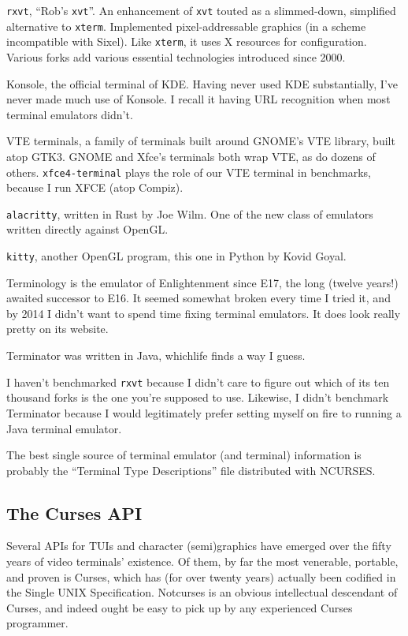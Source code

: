 \begin{denseitemize}
\item{\texttt{rxvt}, ``Rob's \texttt{xvt}''. An enhancement of \texttt{xvt} touted
    as a slimmed-down, simplified alternative to \texttt{xterm}. Implemented pixel-addressable
    graphics (in a scheme incompatible with Sixel). Like \texttt{xterm}, it uses
    X resources for configuration. Various forks add various essential technologies
    introduced since 2000.}
\item{Konsole, the official terminal of KDE. Having never used KDE substantially,
   I've never made much use of Konsole. I recall it having URL recognition
   when most terminal emulators didn't.}
\item{VTE terminals, a family of terminals built around GNOME's VTE library, built
  atop GTK3. GNOME and Xfce's terminals both wrap VTE, as do dozens of others.
  \texttt{xfce4-terminal} plays the role of our VTE terminal in benchmarks, because
  I run XFCE (atop Compiz).}
\item{\texttt{alacritty}, written in Rust by Joe Wilm. One of the new class of
    emulators written directly against OpenGL.}
\item{\texttt{kitty}, another OpenGL program, this one in Python by Kovid Goyal.}
\item{Terminology is the emulator of Enlightenment since E17, the long (twelve
    years!) awaited successor to E16. It seemed somewhat broken every time I
    tried it, and by 2014 I didn't want to spend time fixing terminal emulators.
    It does look really pretty on its website\cite{terminology}.}
\item{Terminator was written in Java, which\textellipsis life finds a way I guess.}
\end{denseitemize}

I haven't benchmarked \texttt{rxvt} because I didn't care to figure out which of
its ten thousand forks is the one you're supposed to use. Likewise, I didn't
benchmark Terminator because I would legitimately prefer setting myself on fire
to running a Java terminal emulator.

The best single source of terminal emulator (and terminal) information is
probably the ``Terminal Type Descriptions'' file distributed with NCURSES\cite{termdescript}.

\subsection{The Curses API}
Several APIs for TUIs and character (semi)graphics have emerged over the fifty
years of video terminals' existence. Of them, by far the most venerable,
portable, and proven is Curses, which has (for over twenty years) actually
been codified in the Single UNIX Specification. Notcurses is an obvious
intellectual descendant of Curses, and indeed ought be easy to pick up by any
experienced Curses programmer.

